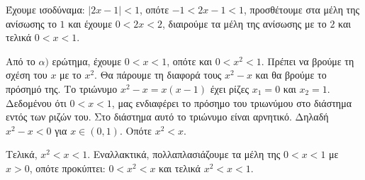 
\begin{alist}
\item Έχουμε ισοδύναμα:
$|2x - 1| < 1$, οπότε
$-1 < 2x - 1 < 1$, προσθέτουμε στα μέλη της ανίσωσης το $1$ και έχουμε
$0 < 2x < 2$, διαιρούμε τα μέλη της ανίσωσης με το $2$ και τελικά
$0 < x < 1$.

\item Από το $\alpha)$ ερώτημα, έχουμε $0 < x < 1$, οπότε και $0 < x^2 < 1$. Πρέπει να βρούμε τη σχέση
του $x$ με το $x^2$. Θα πάρουμε τη διαφορά τους $x^2 - x$ και θα βρούμε το πρόσημό της. Το
τριώνυμο $x^2 - x = x(x - 1)$ έχει ρίζες $x_1 = 0$ και $x_2 = 1$. Δεδομένου ότι $0 < x < 1$, μας
ενδιαφέρει το πρόσημο του τριωνύμου στο διάστημα εντός των ριζών του. Στο διάστημα
αυτό το τριώνυμο είναι αρνητικό. Δηλαδή $x^2 - x < 0$ για $x \in (0, 1)$. Οπότε $x^2 < x$.

Τελικά, $x^2 < x < 1$.
Εναλλακτικά, πολλαπλασιάζουμε τα μέλη της $0 < x < 1$ με $x > 0$, οπότε προκύπτει:
$0 < x^2 < x$ και τελικά $x^2 < x < 1$.
\end{alist}

